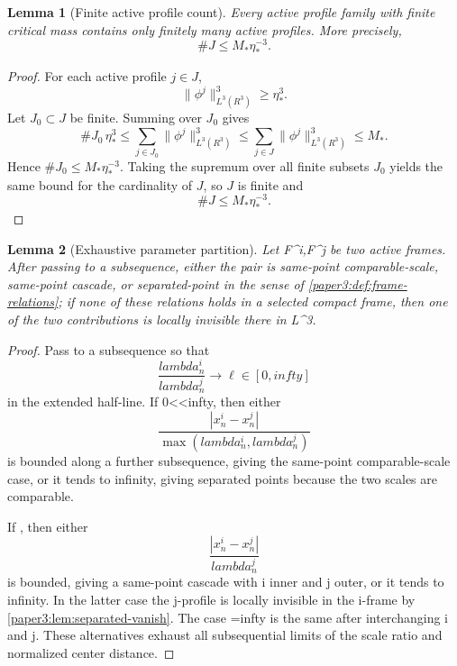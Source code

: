 \documentclass[11pt]{amsart}
\def\({}%
\def\){}%
\def\mathfrak#1{#1}%
\def\mathbb#1{#1}%
\def\lambda{lambda}%
\def\infty{infty}%
\theoremstyle{plain}
\newtheorem{lemma}[lemma]{Lemma}
\theoremstyle{definition}
\theoremstyle{remark}
\begin{document}
\begin{lemma}[Finite active profile count]\label{paper3:lem:finite-active-count}
Every active profile family with finite critical mass contains only finitely many
active profiles.  More precisely,
\[
  \#J\le M_*\eta_*^{-3}.
\]
\end{lemma}

\begin{proof}
For each active profile $j\in J$,
\[
  \|\phi^j\|_{L^3(\mathbb R^3)}^3\ge\eta_*^3.
\]
Let $J_0\subset J$ be finite. Summing over $J_0$ gives
\[
  \#J_0\,\eta_*^3
  \le
  \sum_{j\in J_0}\|\phi^j\|_{L^3(\mathbb R^3)}^3
  \le
  \sum_{j\in J}\|\phi^j\|_{L^3(\mathbb R^3)}^3
  \le M_*.
\]
Hence $\#J_0\le M_*\eta_*^{-3}$.  Taking the supremum over all finite
subsets $J_0$ yields the same bound for the cardinality of $J$, so $J$ is finite
and
\[
  \#J\le M_*\eta_*^{-3}.
\]
\end{proof}

\begin{lemma}[Exhaustive parameter partition]\label{paper3:lem:parameter-partition}
Let \(\mathfrak F^i,\mathfrak F^j\) be two active frames.  After passing to a
subsequence, either the pair is same-point comparable-scale, same-point cascade,
or separated-point in the sense of \cref{paper3:def:frame-relations}; if none of these
relations holds in a selected compact frame, then one of the two contributions
is locally invisible there in \(L^3\).
\end{lemma}

\begin{proof}
Pass to a subsequence so that
\[
  \frac{\lambda^i_n}{\lambda^j_n}\to \ell\in[0,\infty]
\]
in the extended half-line.  If \(0<\ell<\infty\), then either
\[
  \frac{|x^i_n-x^j_n|}{\max(\lambda^i_n,\lambda^j_n)}
\]
is bounded along a further subsequence, giving the same-point comparable-scale
case, or it tends to infinity, giving separated points because the two scales
are comparable.
\par
If \(\), then either
\[
  \frac{|x^i_n-x^j_n|}{\lambda^j_n}
\]
is bounded, giving a same-point cascade with \(i\) inner and \(j\) outer, or it
tends to infinity.  In the latter case the \(j\)-profile is locally invisible in
the \(i\)-frame by \cref{paper3:lem:separated-vanish}.  The case \(\ell=\infty\) is the
same after interchanging \(i\) and \(j\).  These alternatives exhaust all
subsequential limits of the scale ratio and normalized center distance.
\end{proof}
\end{document}

